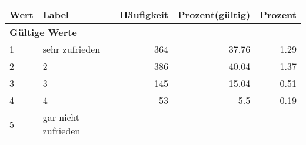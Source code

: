      \begin{longtable}{lXrrr}
     \toprule
     \textbf{Wert} & \textbf{Label} & \textbf{Häufigkeit} & \textbf{Prozent(gültig)} & \textbf{Prozent} \\
     \endhead
     \midrule
     \multicolumn{5}{l}{\textbf{Gültige Werte}}\\

     1 &
     \multicolumn{1}{X}{ sehr zufrieden   } &


       \num{364} &
       \num[round-mode=places,round-precision=2]{37,76} &
         \num[round-mode=places,round-precision=2]{1,29} \\

     2 &
     \multicolumn{1}{X}{ 2   } &


       \num{386} &
       \num[round-mode=places,round-precision=2]{40,04} &
         \num[round-mode=places,round-precision=2]{1,37} \\

     3 &
     \multicolumn{1}{X}{ 3   } &


       \num{145} &
       \num[round-mode=places,round-precision=2]{15,04} &
         \num[round-mode=places,round-precision=2]{0,51} \\

     4 &
     \multicolumn{1}{X}{ 4   } &


       \num{53} &
       \num[round-mode=places,round-precision=2]{5,5} &
         \num[round-mode=places,round-precision=2]{0,19} \\

     5 &
     \multicolumn{1}{X}{ gar nicht zufrieden   } &



\end{longtable}
